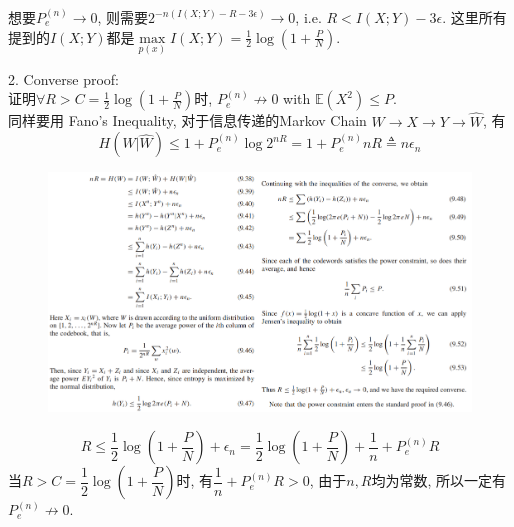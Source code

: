 想要$P_e^{(n)}\to 0$, 则需要$2^{-n(I(X;Y)-R-3\epsilon)}\to 0$, i.e. $R<I(X;Y)-3\epsilon$. 这里所有提到的$I(X;Y)$都是$\max\limits_{p(x)}I(X;Y)=\frac{1}{2}\log \left(1+\frac{P}{N}\right)$.

2. Converse proof: \\
证明$\forall R>C=\frac{1}{2}\log\left(1+\frac{P}{N}\right)$时, $P_e^{(n)}\not\to 0$ with $\mathbb{E}(X^2)\leq P$. \\
同样要用 Fano's Inequality, 对于信息传递的Markov Chain $W\to X\to Y\to \hat{W}$, 有
$$H(W|\hat{W})\leq 1 + P_e^{(n)}\log 2^{nR} = 1 + P_e^{(n)}nR \triangleq n\epsilon_n$$

\begin{figure}[htbp]
    \centering
    \includegraphics[width=1.25\textwidth]{./figures/chapter7/converse.png}
\end{figure}
$$R\leq \dfrac{1}{2}\log\left(1+\dfrac{P}{N}\right)+\epsilon_n=\dfrac{1}{2}\log\left(1+\dfrac{P}{N}\right)+\dfrac{1}{n}+P_e^{(n)}R$$
当$R>C=\dfrac{1}{2}\log\left(1+\dfrac{P}{N}\right)$时, 有$\dfrac{1}{n}+P_e^{(n)}R>0$, 由于$n,R$均为常数, 所以一定有$P_e^{(n)}\not\to 0$.